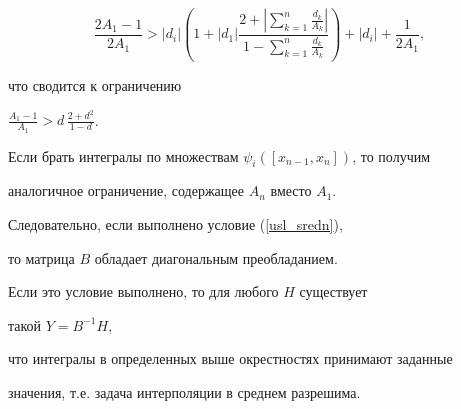 \begin{pf}
$$


\frac{ 2A_1-1 }{ 2A_1 } > |d_i|\left(1 + |d_1|


\frac{2+\left|\sum\limits_{k=1}^n {\frac{d_k}{A_k}}\right|}


{1-\sum\limits_{k=1}^n {\frac{d_k}{A_k}}}\right)


+ |d_i| + \frac{1}{2A_1},


$$


что сводится к ограничению


$\frac{ A_1-1 }{ A_1 } > d \, \frac{2+d^2 }{1-d}$.


Если брать интегралы по множествам $ \psi_i([x_{n-1},x_n]) $, то получим


аналогичное ограничение, содержащее $A_n$ вместо $A_1$.


Следовательно, если выполнено условие (\ref{usl_sredn}),


то матрица $B$ обладает диагональным преобладанием.


Если это условие выполнено, то для любого $H$ существует


такой $ Y = B^{-1} H$,


что интегралы в определенных выше окрестностях принимают заданные


значения, т.е. задача интерполяции в среднем разрешима.


\end{pf}





